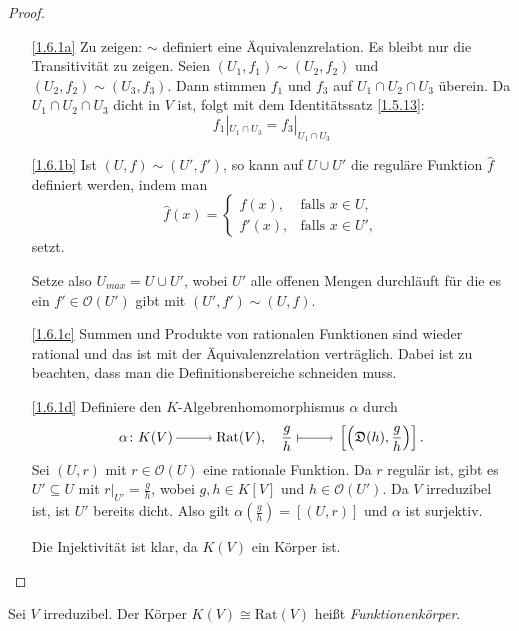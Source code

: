 \documentclass[a4paper,12pt,index=toc]{scrbook}
\theoremstyle{keinenummern} %
\def\O{\mathcal{O}}
\newcommand{\D}{\mathfrak{D}}
\newcommand{\Rat}{\mathrm{Rat}}
\newcommand{\restrict}[1]{|_{#1}}
\newcommand{\dach}{\widehat}
\begin{document}
\begin{proof}
\begin{enumerate}
\item[\ref{1.6.1a}] Zu zeigen: $\sim$ definiert eine Äquivalenzrelation. Es bleibt nur die Transitivität zu zeigen.
Seien $(U_1,f_1)\sim (U_2,f_2)$ und $(U_2,f_2)\sim (U_3,f_3)$. Dann stimmen $f_1$ und $f_3$ auf $U_1\cap U_2\cap U_3$ überein. Da $U_1\cap U_2\cap U_3$ dicht in $V$ ist, folgt mit dem Identitätssatz \cref{1.5.13}:
\begin{equation*}f_1\restrict{U_1\cap U_3}=f_3\restrict{U_1\cap U_3}\end{equation*}
\item[\ref{1.6.1b}] Ist $(U,f)\sim(U',f')$, so kann auf $U\cup U'$ die reguläre Funktion $\dach{f}$ definiert werden, indem man 
\begin{equation*}\dach{f}(x)=\begin{cases} f(x),&\text{falls } x\in U, \\ f'(x),&\text{falls } x\in U',\end{cases}\end{equation*} setzt.

Setze also $U_{max}=U\cup U'$, wobei $U'$ alle offenen Mengen durchläuft für die es ein $f'\in \O(U')$ gibt mit $(U',f')\sim (U,f)$.
\item[\ref{1.6.1c}] Summen und Produkte von rationalen Funktionen sind wieder rational und das ist mit der Äquivalenzrelation verträglich. Dabei ist zu beachten, dass man die Definitionsbereiche schneiden muss.
\item[\ref{1.6.1d}] Definiere den $K$-Algebrenhomomorphismus $\alpha$ durch
\begin{equation*}\alpha\colon K(V)\ra \Rat(V), \quad \frac{g}{h}\mapsto\relax \left[\left(\D(h),\frac{g}{h}\right)\right].\end{equation*} 
Sei $(U,r)$ mit $r\in \O(U)$ eine rationale Funktion. Da $r$ regulär ist, gibt es $U'\subseteq U$ mit $r\restrict{U'}=\frac{g}{h}$, wobei
$g,h \in K[V]$ und $h\in \O(U')$. Da $V$ irreduzibel ist, ist $U'$ bereits dicht. Also gilt $\alpha(\frac{g}{h})=[(U,r)]$ und $\alpha$ ist surjektiv.

Die Injektivität ist klar, da $K(V)$ ein Körper ist.
\end{enumerate}
\end{proof}

\begin{dfn}\label{1.6.2}
Sei $V$ irreduzibel. Der Körper $K(V)\cong \Rat(V)$ heißt \emph{Funktionenkörper}.
\end{dfn}
\end{document}
